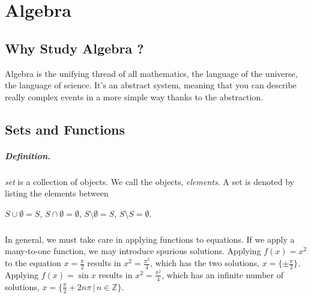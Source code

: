 
\chapter{Algebra}
\section{Why Study Algebra ?}
Algebra is the unifying thread of all mathematics, the language of the universe, the language of science.
It's an abstract system, meaning that you can describe really complex events in a more simple way thanks to the abstraction.


\section{Sets and Functions}


\paragraph{Definition.}

\textit{set} is a collection of objects.  We call the objects, 
\textit{elements}.   A set is denoted by listing the elements between

$S \cup \emptyset = S$, $S \cap \emptyset = \emptyset$,
$S \setminus \emptyset = S$, $S \setminus S = \emptyset$. 

\paragraph{}
In general, we must take care in applying functions to equations.
If we apply a many-to-one function, we may introduce spurious
solutions.  Applying $f(x) = x^2$ to the equation
$x = \frac{\pi}{2}$ results in $x^2 = \frac{\pi^2}{4}$, which has the two solutions,
$x = \{ \pm \frac{\pi}{2} \}$.
Applying $f(x) = \sin x$ results in $x^2 = \frac{\pi^2}{4}$, which has 
an infinite number of solutions,
$x = \{ \frac{\pi}{2} + 2 n \pi \,|\, n \in \mathbb{Z} \}$.

